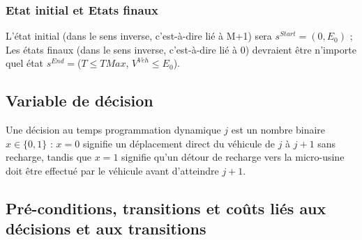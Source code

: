 \subsubsection{Etat initial et Etats finaux}


L'état initial (dans le sens inverse, c'est-à-dire lié à M+1) sera $ s^{Start}=(0, E_0)$ ; Les états finaux (dans le sens inverse, c'est-à-dire lié à 0) devraient être n'importe quel état $s^{End}=$($T \leq TMax$, $V^{Veh} \leq E_0$). 
\subsection{Variable de décision}

Une décision au temps programmation dynamique $j$ est un nombre binaire $x \in \{0, 1\}$ : $x = 0 $ signifie un déplacement direct du véhicule de $j$ à $j+1$ sans recharge, tandis que $x = 1$ signifie qu'un détour de recharge vers la micro-usine doit être effectué par le véhicule avant d'atteindre $j+1$. 



\subsection{Pré-conditions, transitions et coûts liés aux décisions et aux transitions}

